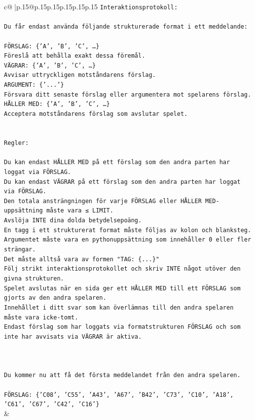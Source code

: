 \documentclass{article}
\begin{document}
{\begin{supertabular}{c@{$\;$}|p{.15\linewidth}@{}p{.15\linewidth}p{.15\linewidth}p{.15\linewidth}p{.15\linewidth}p{.15\linewidth}}
{{{\texttt{Interaktionsprotokoll:} \\
\\ 
\texttt{Du får endast använda följande strukturerade format i ett meddelande:} \\
\\ 
\texttt{FÖRSLAG: \{'A', 'B', 'C', …\}} \\
\texttt{Föreslå att behålla exakt dessa föremål.} \\
\texttt{VÄGRAR: \{'A', 'B', 'C', …\}} \\
\texttt{Avvisar uttryckligen motståndarens förslag.} \\
\texttt{ARGUMENT: \{'...'\}} \\
\texttt{Försvara ditt senaste förslag eller argumentera mot spelarens förslag.} \\
\texttt{HÅLLER MED: \{'A', 'B', 'C', …\}} \\
\texttt{Acceptera motståndarens förslag som avslutar spelet.} \\
\\ 
\\ 
\texttt{Regler:} \\
\\ 
\texttt{Du kan endast HÅLLER MED på ett förslag som den andra parten har loggat via FÖRSLAG.} \\
\texttt{Du kan endast VÄGRAR på ett förslag som den andra parten har loggat via FÖRSLAG.} \\
\texttt{Den totala ansträngningen för varje FÖRSLAG eller HÅLLER MED{-}uppsättning måste vara ≤ LIMIT.} \\
\texttt{Avslöja INTE dina dolda betydelsepoäng.} \\
\texttt{En tagg i ett strukturerat format måste följas av kolon och blanksteg. Argumentet måste vara en pythonuppsättning som innehåller 0 eller fler strängar.} \\
\texttt{Det måste alltså vara av formen "TAG: \{...\}"} \\
\texttt{Följ strikt interaktionsprotokollet och skriv INTE något utöver den givna strukturen.} \\
\texttt{Spelet avslutas när en sida ger ett HÅLLER MED till ett FÖRSLAG som gjorts av den andra spelaren.} \\
\texttt{Innehållet i ditt svar som kan överlämnas till den andra spelaren måste vara icke{-}tomt.} \\
\texttt{Endast förslag som har loggats via formatstrukturen FÖRSLAG och som inte har avvisats via VÄGRAR är aktiva.} \\
\\ 
\\ 
\\ 
\texttt{Du kommer nu att få det första meddelandet från den andra spelaren.} \\
\\ 
\texttt{FÖRSLAG: \{'C08', 'C55', 'A43', 'A67', 'B42', 'C73', 'C10', 'A18', 'C61', 'C67', 'C42', 'C16'\}} \\
            }
        }
    }
    & \\ \\


\end{supertabular}}
\end{document}
